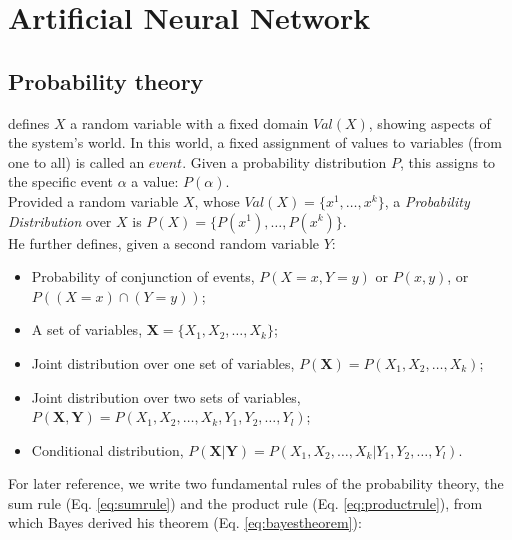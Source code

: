 
\chapter{Artificial Neural Network}
\label{cap:ann}

\section{Probability theory}
\label{sec:probability}

\citet{RefWorks:194} defines $X$ a random variable with a fixed domain $Val(X)$,
showing aspects of the system's world. In this world, a fixed assignment of
values to variables (from one to all) is called an $event$.
Given a probability distribution $P$, this assigns to the specific event
$\alpha$ a value: $P(\alpha)$.\\
Provided a random variable $X$, whose $Val(X) = \{ x^1, \ldots , x^k \}$, a
\textit{Probability Distribution} over $X$ is $P(X) = \{ P(x^1), \ldots , P(x^k)
\}$.\\
He further defines, given a second random variable $Y$:
\begin{itemize}
  \item {Probability of conjunction of events, $P(X = x, Y = y)$ or $P(x, y)$,
  or $P((X = x) \cap (Y = y))$;}
  \item {A set of variables, $\mathbf{X} = \{X_1, X_2, \ldots , X_k \}$;}
  \item {Joint distribution over one set of variables, $P(\mathbf{X}) =
  P(X_1, X_2, \ldots , X_k) $;}
  \item {Joint distribution over two sets of variables, $P(\mathbf{X, Y}) =
  P(X_1, X_2, \ldots , X_k, Y_1, Y_2, \ldots , Y_l  ) $;}
  \item {Conditional distribution, $P(\mathbf{X | Y}) =
  P(X_1, X_2, \ldots , X_k | Y_1, Y_2, \ldots , Y_l  ) $.}
\end{itemize}

For later reference, we write two fundamental rules of the probability theory,
the sum rule (Eq. \ref{eq:sumrule}) and the product rule (Eq.
\ref{eq:productrule}), from which Bayes derived his theorem (Eq.
\ref{eq:bayestheorem}):




